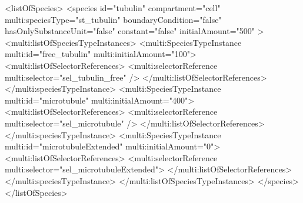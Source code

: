 \begin{example}
    <listOfSpecies>
      <species id="tubulin" compartment="cell" multi:speciesType="st_tubulin"
               boundaryCondition="false" hasOnlySubstanceUnit="false" 
               constant="false" initialAmount="500" >
        <multi:listOfSpeciesTypeInstances>
          <multi:SpeciesTypeInstance multi:id="free_tubulin" multi:initialAmount="100">
            <multi:listOfSelectorReferences>
              <multi:selectorReference multi:selector="sel_tubulin_free" />
            </multi:listOfSelectorReferences>
          </multi:speciesTypeInstance>
          <multi:SpeciesTypeInstance multi:id="microtubule" multi:initialAmount="400">
            <multi:listOfSelectorReferences>
              <multi:selectorReference multi:selector="sel_microtubule" />
            </multi:listOfSelectorReferences>
          </multi:speciesTypeInstance>
          <multi:SpeciesTypeInstance multi:id="microtubuleExtended" multi:initialAmount="0">
            <multi:listOfSelectorReferences>
              <multi:selectorReference multi:selector="sel_microtubuleExtended">
            </multi:listOfSelectorReferences>
          </multi:speciesTypeInstance>
        </multi:listOfSpeciesTypeInstances>
      </species>
    </listOfSpecies>


\end{example}
